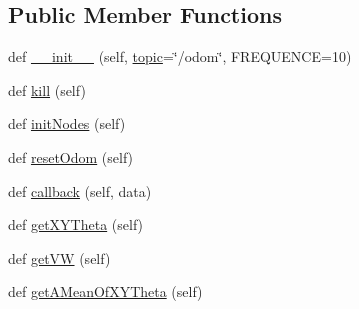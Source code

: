 \subsection*{Public Member Functions}
\begin{DoxyCompactItemize}
\item 
def \hyperlink{classcmd__TTB_1_1rosCom_1_1TurtlebotListener_aa8320dde62def929f13c1989cda19b47}{\+\_\+\+\_\+init\+\_\+\+\_\+} (self, \hyperlink{classcmd__TTB_1_1rosCom_1_1TurtlebotListener_ad2568a558e1f8eb925e740feecd64da8}{topic}=\char`\"{}/odom\char`\"{}, F\+R\+E\+Q\+U\+E\+N\+CE=10)
\item 
def \hyperlink{classcmd__TTB_1_1rosCom_1_1TurtlebotListener_a597fc8de6590574505b032bc6ad0cdca}{kill} (self)
\item 
def \hyperlink{classcmd__TTB_1_1rosCom_1_1TurtlebotListener_a25ae5c5eacd3aa023aadcec9807b9e17}{init\+Nodes} (self)
\item 
def \hyperlink{classcmd__TTB_1_1rosCom_1_1TurtlebotListener_a2b85e835bd92eb645e96fca1086ea457}{reset\+Odom} (self)
\item 
def \hyperlink{classcmd__TTB_1_1rosCom_1_1TurtlebotListener_a4ee11b98fcffb76eb92865ba8d3f9ede}{callback} (self, data)
\item 
def \hyperlink{classcmd__TTB_1_1rosCom_1_1TurtlebotListener_a6bf38ca3f7ce77d48989eca2b1ae342c}{get\+X\+Y\+Theta} (self)
\item 
def \hyperlink{classcmd__TTB_1_1rosCom_1_1TurtlebotListener_a15c2ab52985c74917e81e3309ba53dce}{get\+VW} (self)
\item 
def \hyperlink{classcmd__TTB_1_1rosCom_1_1TurtlebotListener_ab9e1187d6fbb94c299af17c1834bd5fc}{get\+A\+Mean\+Of\+X\+Y\+Theta} (self)
\end{DoxyCompactItemize}
